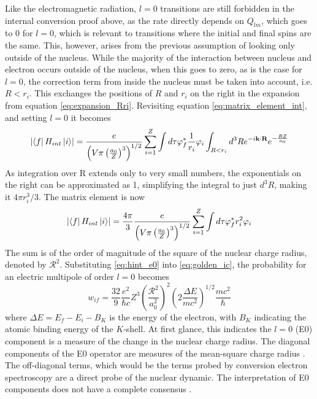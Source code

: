 Like the electromagnetic radiation, $l=0$ transitions are still forbidden in the internal conversion proof above, as the rate directly depends on $Q_{lm}$, which goes to 0 for $l=0$, which is relevant to transitions where the initial and final spins are the same. This, however, arises from the previous assumption of looking only outside of the nucleus. While the majority of the interaction between nucleus and electron occurs outside of the nucleus, when this goes to zero, as is the case for $l=0$, the correction term from inside the nucleus must be taken into account, i.e. $R<r_i$. This exchanges the positions of $R$ and $r_i$ on the right in the expansion from equation \ref{eq:expansion_Rri}. Revisiting equation \ref{eq:matrix_element_int}, and setting $l=0$ it becomes
\begin{equation}
\label{eq:matrix_element_E0}
    \abs{\bra{f}H_{int}\ket{i}} = \frac{e}{\left(V\pi\left(\frac{a_0}{Z}\right)^3\right)^{1/2}}\sum_{i=1}^Z \int d\tau\varphi_{f}^*\frac{1}{r_i}\varphi_{i} \int_{R<r_i}d^3R e^{-i\textbf{k}\cdot\textbf{R}} e^{-\frac{RZ}{a_0}}
\end{equation}
As integration over R extends only to very small numbers, the exponentials on the right can be approximated as 1, simplifying the integral to just $d^3R$, making it $4\pi r_i^3/3$. The matrix element is now
\begin{equation}
\label{eq:hint_e0}
    \abs{\bra{f}H_{int}\ket{i}} =  \frac{4\pi}{3}\frac{e}{\left(V\pi\left(\frac{a_0}{Z}\right)^3\right)^{1/2}} \sum_{i=1}^Z \int d\tau\varphi_{f}^*r_i^2\varphi_{i}
\end{equation}
The sum is of the order of magnitude of the square of the nuclear charge radius, denoted by $\mathcal{R}^2$. Substituting \ref{eq:hint_e0} into \ref{eq:golden_ic}, the probability for an electric multipole of order $l=0$ becomes
\begin{equation}
    w_{if} = \frac{32}{9}\frac{e^2}{\hbar c}Z^3\left(\frac{\mathcal{R}^2}{a_0^2}\right)^2\left(2\frac{\Delta E}{mc^2}\right)^{1/2}\frac{mc^2}{\hbar}
\end{equation}
where $\Delta E=E_f-E_i-B_K$ is the energy of the electron, with $B_K$ indicating the atomic binding energy of the $K$-shell. At first glance, this indicates the $l=0$ (E0) component is a measure of the change in the nuclear charge radius. The diagonal components of the E0 operator are measures of the mean-square charge radius \citep{wood99:_e0}. The off-diagonal terms, which would be the terms probed by conversion electron spectroscopy are a direct probe of the nuclear dynamic. The interpretation of E0 components does not have a complete consensus \citep{ilie11:_deformed}.

